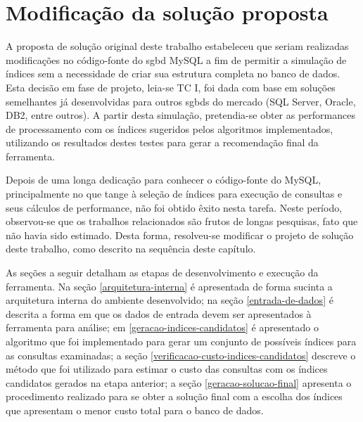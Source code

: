 \section{Modificação da solução proposta}
\label{modificacao-solucao}

A proposta de solução original deste trabalho estabeleceu que seriam realizadas modificações no código-fonte do \gls{sgbd} MySQL a fim de permitir a simulação de índices sem a necessidade de criar sua estrutura completa no banco de dados. Esta decisão em fase de projeto, leia-se TC I, foi dada com base em soluções semelhantes já desenvolvidas para outros \glspl{sgbd} do mercado (SQL Server, Oracle, DB2, entre outros). A partir desta simulação, pretendia-se obter as performances de processamento com os índices sugeridos pelos algoritmos implementados, utilizando os resultados destes testes para gerar a recomendação final da ferramenta.

Depois de uma longa dedicação para conhecer o código-fonte do MySQL, principalmente no que tange à seleção de índices para execução de consultas e seus cálculos de performance, não foi obtido êxito nesta tarefa. Neste período, observou-se que os trabalhos relacionados são frutos de longas pesquisas, fato que não havia sido estimado. Desta forma, resolveu-se modificar o projeto de solução deste trabalho, como descrito na sequência deste capítulo.

As seções a seguir detalham as etapas de desenvolvimento e execução da ferramenta. Na seção \ref{arquitetura-interna} é apresentada de forma sucinta a arquitetura interna do ambiente desenvolvido; na seção \ref{entrada-de-dados} é descrita a forma em que os dados de entrada devem ser apresentados à ferramenta para análise; em \ref{geracao-indices-candidatos} é apresentado o algoritmo que foi implementado para gerar um conjunto de possíveis índices para as consultas examinadas; a seção \ref{verificacao-custo-indices-candidatos} descreve o método que foi utilizado para estimar o custo das consultas com os índices candidatos gerados na etapa anterior; a seção \ref{geracao-solucao-final} apresenta o procedimento realizado para se obter a solução final com a escolha dos índices que apresentam o menor custo total para o banco de dados.

